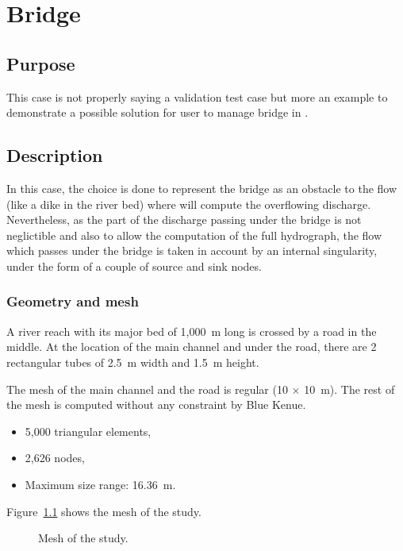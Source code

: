\chapter{Bridge}
\section{Purpose}

This case is not properly saying a validation test case but more an example to
demonstrate a possible solution for user to manage bridge in .

\section{Description}

In this case, the choice is done to represent the bridge as an obstacle to
the flow (like a dike in the river bed) where  will compute the
overflowing discharge. Nevertheless, as the part of the discharge passing under
the bridge is not neglictible and also to allow the computation of the full
hydrograph, the flow which passes under the bridge is taken in account by an
internal singularity, under the form of a couple of source and sink nodes.

\subsection{Geometry and mesh}

A river reach with its major bed of 1,000~m long is crossed by a road in the
middle.
At the location of the main channel and under the road, there are 2 rectangular
tubes of 2.5~m width and 1.5~m height.

The mesh of the main channel and the road is regular (10 $\times$ 10~m).
The rest of the mesh is computed without any constraint by Blue Kenue.

\begin{itemize}
\item 5,000 triangular elements,
\item 2,626 nodes,
\item Maximum size range: 16.36~m.
\end{itemize}

Figure~\ref{fig:bridge:mesh} shows the mesh of the study.
\begin{figure}
\centering
{}
\caption{Mesh of the study.}\label{fig:bridge:mesh}
\end{figure}


